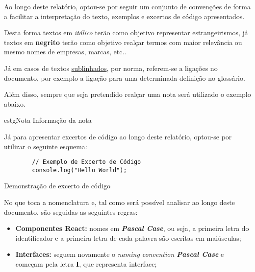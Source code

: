 
Ao longo deste relatório, optou-se por seguir um conjunto de convenções de forma a facilitar a interpretação do texto, exemplos e excertos de código apresentados.

Desta forma textos em \textit{itálico} terão como objetivo representar estrangeirismos, já textos em \textbf{negrito} terão como objetivo realçar termos com maior relevância ou mesmo nomes de empresas, marcas, etc..

Já em casos de textos \underline{sublinhados}, por norma, referem-se a ligações no documento, por exemplo a ligação para uma determinada definição no glossário.

Além disso, sempre que seja pretendido realçar uma nota será utilizado o exemplo abaixo.

\vspace{0.01cm}

\begin{mybox}{estg}{Nota}
	Informação da nota
\end{mybox}

\vspace{0.1cm}

Já para apresentar excertos de código ao longo deste relatório, optou-se por utilizar o seguinte esquema:

\vspace{0.01cm}

\begin{longlisting}
	\begin{verbatim}
		// Exemplo de Excerto de Código
		console.log("Hello World");
	\end{verbatim}
	\caption{Demonstração de excerto de código}
\end{longlisting}

\vspace{0.1cm}

No que toca a nomenclatura e, tal como será possível analisar ao longo deste documento, são seguidas as seguintes regras:

\begin{itemize}
	\item \textbf{Componentes React:} nomes em \textit{\textbf{Pascal Case}}, ou seja, a primeira letra do identificador e a primeira letra de cada palavra são escritas em maiúsculas;
	\item \textbf{Interfaces:} seguem novamente o \textit{naming convention \textbf{Pascal Case}} e começam pela letra \textbf{I}, que representa interface;
\end{itemize}